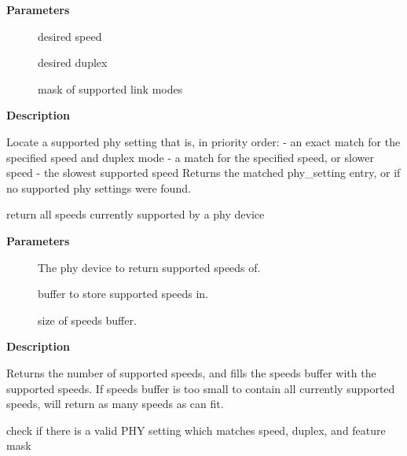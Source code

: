 \documentclass[a4paper,8pt,english]{sphinxmanual}
\begin{document}
\textbf{Parameters}
\begin{description}
\item[{}] \leavevmode
desired speed

\item[{}] \leavevmode
desired duplex

\item[{}] \leavevmode
mask of supported link modes

\end{description}

\textbf{Description}

Locate a supported phy setting that is, in priority order:
- an exact match for the specified speed and duplex mode
- a match for the specified speed, or slower speed
- the slowest supported speed
Returns the matched phy\_setting entry, or  if no supported phy
settings were found.

\begin{fulllineitems}
\label{networking/kapi:c.phy_supported_speeds}
return all speeds currently supported by a phy device

\end{fulllineitems}


\textbf{Parameters}
\begin{description}
\item[{}] \leavevmode
The phy device to return supported speeds of.

\item[{}] \leavevmode
buffer to store supported speeds in.

\item[{}] \leavevmode
size of speeds buffer.

\end{description}

\textbf{Description}

Returns the number of supported speeds, and fills the speeds
buffer with the supported speeds. If speeds buffer is too small to contain
all currently supported speeds, will return as many speeds as can fit.

\begin{fulllineitems}
\label{networking/kapi:c.phy_check_valid}
check if there is a valid PHY setting which matches speed, duplex, and feature mask

\end{fulllineitems}
\end{document}
